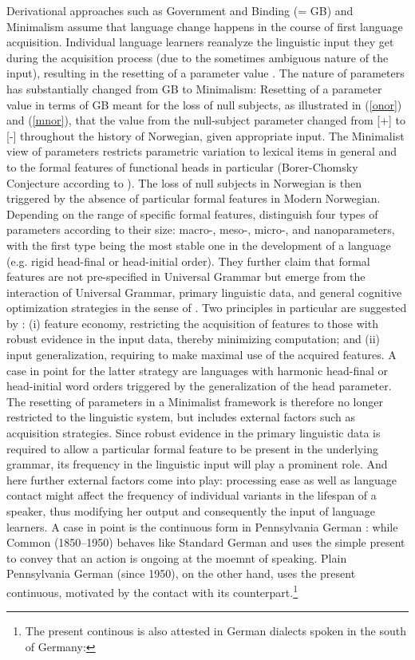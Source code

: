 \documentclass[output=paper
                ,modfonts
                ,nonflat
	        ,collection
	        ,collectionchapter
	        ,collectiontoclongg
 	        ,biblatex
                ,babelshorthands
                ,newtxmath
                ,draftmode
                ,colorlinks, citecolor=brown
]{./langsci/langscibook}
\begin{document}
Derivational approaches such as Government and Binding (= GB) and Minimalism assume that language change happens in the course of first language acquisition. Individual language learners reanalyze the linguistic input they get during the acquisition process (due to the sometimes ambiguous nature of the input), resulting in the resetting of a parameter value \citep{lightfoot1979}. The nature of parameters has substantially changed from GB to Minimalism: Resetting of a parameter value in terms of GB meant for the loss of null subjects, as illustrated in (\ref{onor}) and (\ref{mnor}), that the value from the null-subject parameter changed from [+] to [-] throughout the history of Norwegian, given appropriate input. The Minimalist view of parameters restricts parametric variation to lexical items in general and to the formal features of functional heads in particular (Borer-Chomsky Conjecture according to \cite{baker2008}). The loss of null subjects in Norwegian is then triggered by the absence of particular formal features in Modern Norwegian. Depending on the range of specific formal features, \cite{BiRo2017} distinguish four types of parameters according to their size: macro-, meso-, micro-, and nanoparameters, with the first type being the most stable one in the development of a language (e.g. rigid head-final or head-initial order). They further claim that formal features are not pre-specified in Universal Grammar but emerge from the interaction of Universal Grammar, primary linguistic data, and general cognitive optimization strategies in the sense of \cite{chomsky2005}. Two principles in particular are suggested by \cite{BiRo2017}: (i) feature economy, restricting the acquisition of features to those with robust evidence in the input data, thereby minimizing computation; and (ii) input generalization, requiring to make maximal use of the acquired features. A case in point for the latter strategy are languages with harmonic head-final or head-initial word orders triggered by the generalization of the head parameter. The resetting of parameters in a Minimalist framework is therefore no longer restricted to the linguistic system, but includes external factors such as acquisition strategies. Since robust evidence in the primary linguistic data is required to allow a particular formal feature to be present in the underlying grammar, its frequency in the linguistic input will play a prominent role. And here further external factors come into play: processing ease as well as language contact might affect the frequency of individual variants in the lifespan of a speaker, thus modifying her output and consequently the input of language learners. A case in point is the continuous form in Pennsylvania German \citep{louden1988}: while Common  (1850--1950) behaves like Standard German and uses the simple present to convey that an action is ongoing at the moemnt of speaking. Plain Pennsylvania German (since 1950), on the other hand, uses the present continuous, motivated by the contact with its  counterpart.\footnote{The present continous is also attested in German dialects spoken in the south of Germany: 
}
\end{document}
